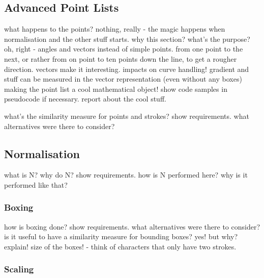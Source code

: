 

\subsection{Advanced Point Lists}
\label{sec:hwre:advancedpointlists}

what happens to the points?
nothing, really - the magic happens when normalisation and the other stuff
starts.
why this section? what's the purpose? oh, right - angles and vectors instead
of simple points. from one point to the next, or rather from on point to
ten points down the line, to get a rougher direction.
vectors make it interesting. 
impacts on curve handling! gradient and stuff can be measured in the 
vector representation (even without any boxes)
making the point list a cool mathematical object!
show code samples in pseudocode if necessary.
report about the cool stuff.

what's the similarity measure for
points and strokes?
show requirements.
what alternatives were there to consider?

\subsection{Normalisation}
\label{sec:hwre:normalisation}

what is N?
why do N?
show requirements.
how is N performed here?
why is it performed like that?

\subsubsection{Boxing}
\label{sec:hwre:boxing}
how is boxing done?
show requirements.
what alternatives were there to consider?
is it useful to have a similarity measure for bounding boxes?
yes! but why? explain!
size of the boxes! - think of characters that only have two strokes.

\subsubsection{Scaling}
\label{sec:hwre:scaling}

